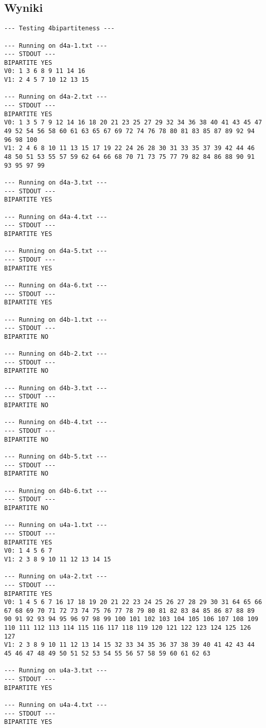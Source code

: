\documentclass{article}
\begin{document}
\subsection{Wyniki}
\begin{verbatim}
--- Testing 4bipartiteness ---

--- Running on d4a-1.txt ---
--- STDOUT ---
BIPARTITE YES
V0: 1 3 6 8 9 11 14 16
V1: 2 4 5 7 10 12 13 15

--- Running on d4a-2.txt ---
--- STDOUT ---
BIPARTITE YES
V0: 1 3 5 7 9 12 14 16 18 20 21 23 25 27 29 32 34 36 38 40 41 43 45 47 49 52 54 56 58 60 61 63 65 67 69 72 74 76 78 80 81 83 85 87 89 92 94 96 98 100
V1: 2 4 6 8 10 11 13 15 17 19 22 24 26 28 30 31 33 35 37 39 42 44 46 48 50 51 53 55 57 59 62 64 66 68 70 71 73 75 77 79 82 84 86 88 90 91 93 95 97 99

--- Running on d4a-3.txt ---
--- STDOUT ---
BIPARTITE YES

--- Running on d4a-4.txt ---
--- STDOUT ---
BIPARTITE YES

--- Running on d4a-5.txt ---
--- STDOUT ---
BIPARTITE YES

--- Running on d4a-6.txt ---
--- STDOUT ---
BIPARTITE YES

--- Running on d4b-1.txt ---
--- STDOUT ---
BIPARTITE NO

--- Running on d4b-2.txt ---
--- STDOUT ---
BIPARTITE NO

--- Running on d4b-3.txt ---
--- STDOUT ---
BIPARTITE NO

--- Running on d4b-4.txt ---
--- STDOUT ---
BIPARTITE NO

--- Running on d4b-5.txt ---
--- STDOUT ---
BIPARTITE NO

--- Running on d4b-6.txt ---
--- STDOUT ---
BIPARTITE NO

--- Running on u4a-1.txt ---
--- STDOUT ---
BIPARTITE YES
V0: 1 4 5 6 7
V1: 2 3 8 9 10 11 12 13 14 15

--- Running on u4a-2.txt ---
--- STDOUT ---
BIPARTITE YES
V0: 1 4 5 6 7 16 17 18 19 20 21 22 23 24 25 26 27 28 29 30 31 64 65 66 67 68 69 70 71 72 73 74 75 76 77 78 79 80 81 82 83 84 85 86 87 88 89 90 91 92 93 94 95 96 97 98 99 100 101 102 103 104 105 106 107 108 109 110 111 112 113 114 115 116 117 118 119 120 121 122 123 124 125 126 127
V1: 2 3 8 9 10 11 12 13 14 15 32 33 34 35 36 37 38 39 40 41 42 43 44 45 46 47 48 49 50 51 52 53 54 55 56 57 58 59 60 61 62 63

--- Running on u4a-3.txt ---
--- STDOUT ---
BIPARTITE YES

--- Running on u4a-4.txt ---
--- STDOUT ---
BIPARTITE YES


\end{verbatim}
\end{document}
